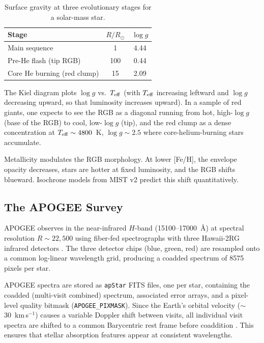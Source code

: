 \documentclass[10pt,preprint2]{aastex}
\begin{document}
\begin{table}[H]
\centering
\caption{Surface gravity at three evolutionary stages for a solar-mass star.\label{tab:logg_stages}}
\begin{tabular}{lcc}
\toprule
Stage & $R/R_\odot$ & $\log g$ \\
\midrule
Main sequence          & 1    & 4.44  \\
Pre-He flash (tip RGB) & 100  & 0.44  \\
Core He burning (red clump) & 15 & 2.09 \\
\bottomrule
\end{tabular}
\end{table}

The Kiel diagram plots $\log g$ vs.\ $T_{\rm eff}$ (with $T_{\rm eff}$ increasing leftward and $\log g$ decreasing upward, so that luminosity increases upward). In a sample of red giants, one expects to see the RGB as a diagonal running from hot, high-$\log g$ (base of the RGB) to cool, low-$\log g$ (tip), and the red clump as a dense concentration at $T_{\rm eff} \sim 4800$~K, $\log g \sim 2.5$ where core-helium-burning stars accumulate.

Metallicity modulates the RGB morphology. At lower [Fe/H], the envelope opacity decreases, stars are hotter at fixed luminosity, and the RGB shifts blueward. Isochrone models from MIST v2 \citep{Dotter2025} predict this shift quantitatively.

\subsection{The APOGEE Survey}

APOGEE \citep{Majewski2017} observes in the near-infrared $H$-band (15100--17000~\AA) at spectral resolution $R \sim 22{,}500$ using fiber-fed spectrographs with three Hawaii-2RG infrared detectors \citep{Wilson2019}. The three detector chips (blue, green, red) are resampled onto a common log-linear wavelength grid, producing a coadded spectrum of 8575 pixels per star.

APOGEE spectra are stored as \texttt{apStar} FITS files, one per star, containing the coadded (multi-visit combined) spectrum, associated error arrays, and a pixel-level quality bitmask (\texttt{APOGEE\_PIXMASK}). Since the Earth's orbital velocity ($\sim$30~km\,s$^{-1}$) causes a variable Doppler shift between visits, all individual visit spectra are shifted to a common Barycentric rest frame before coaddition \citep{Nidever2015}. This ensures that stellar absorption features appear at consistent wavelengths.
\end{document}
